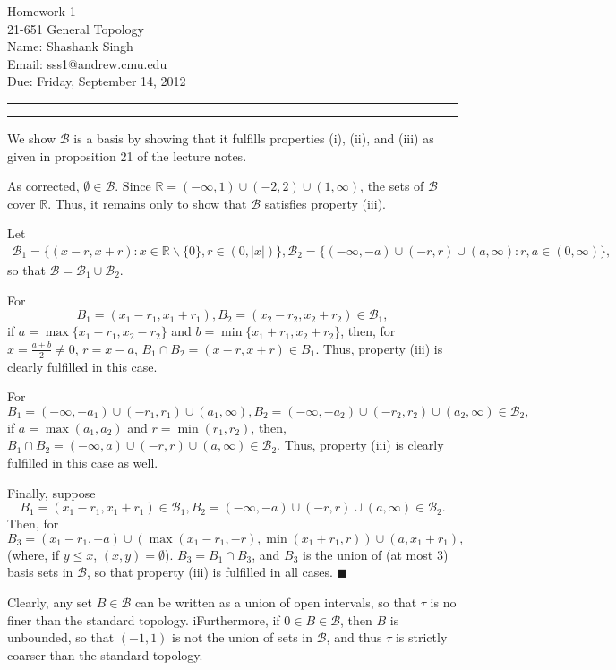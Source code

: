 \documentclass[11pt]{article}
\makeatletter
\newcounter{questionCounter}
\newcounter{partCounter}[questionCounter]
\newenvironment{question}[2][\arabic{questionCounter}]{%
    \setcounter{partCounter}{0}%
    \vspace{.25in} \hrule \vspace{0.5em}%
        \noindent{\bf #2}%
    \vspace{0.8em} \hrule \vspace{.10in}%
    \addtocounter{questionCounter}{1}%
}{}
\newcommand{\myname}{Shashank Singh}
\newcommand{\myandrew}{sss1@andrew.cmu.edu}
\newcommand{\myclass}{21-651 General Topology}
\newcommand{\myhwnum}{1}
\newcommand{\duedate}{Friday, September 14, 2012}
\renewcommand{\qed}{\quad $\blacksquare$}
\newcommand{\sminus}{\backslash}
\makeatother
\begin{document}
\thispagestyle{plain}

{\Large Homework \myhwnum} \\
\myclass \\
Name: \myname \\
Email: \myandrew \\
Due: \duedate \\
\begin{question}{Problem 1}
We show $\mathcal{B}$ is a basis by showing that it fulfills properties (i),
(ii), and (iii) as given in proposition 21 of the lecture notes.

As corrected, $\emptyset \in \mathcal{B}$.
Since $\mathbb{R} = (-\infty,1) \cup (-2,2) \cup (1,\infty)$, the sets of
$\mathcal{B}$ cover $\mathbb{R}$. Thus, it remains only to show that
$\mathcal{B}$ satisfies property (iii).

Let
\begin{align*}
\mathcal{B}_1 = \{(x - r,x + r) : x \in \mathbb{R}\sminus\{0\},
                                                              r \in (0,|x|)\},
\mathcal{B}_2 = \{(-\infty,-a) \cup (-r,r) \cup (a,\infty) :
                                                         r,a \in (0,\infty)\},
\end{align*}
so that $\mathcal{B} = \mathcal{B_1} \cup \mathcal{B_2}$.

For
\[B_1 = (x_1 - r_1,x_1 + r_1),B_2 = (x_2 - r_2,x_2 + r_2) \in \mathcal{B}_1,\]
if
$a = \max\{x_1 - r_1,x_2 - r_2\}$ and $b = \min\{x_1 + r_1,x_2 + r_2\}$,
then, for $x = \frac{a + b}{2} \neq 0$, $r = x - a$,
$B_1 \cap B_2 = (x - r,x + r) \in B_1$. Thus, property (iii) is clearly
fulfilled in this case.

For 
\[B_1 = (-\infty,-a_1) \cup (-r_1,r_1) \cup (a_1,\infty),
  B_2 = (-\infty,-a_2) \cup (-r_2,r_2) \cup (a_2,\infty) \in \mathcal{B}_2,\]
if $a = \max(a_1,a_2)$ and $r = \min(r_1,r_2)$, then,
$B_1 \cap B_2 = (-\infty,a) \cup (-r,r) \cup (a,\infty) \in \mathcal{B}_2$.
Thus, property (iii) is clearly fulfilled in this case as well.

Finally, suppose
\[B_1 = (x_1 - r_1,x_1 + r_1) \in \mathcal{B}_1,
  B_2 = (-\infty,-a) \cup (-r,r) \cup (a,\infty) \in \mathcal{B}_2.\]
Then, for
\[B_3 = (x_1 - r_1,-a) \cup (\max(x_1 - r_1,-r),\min(x_1 + r_1,r)) \cup (a,x_1 + r_1),\]
(where, if $y \leq x$, $(x,y) = \emptyset$).
$B_3 = B_1 \cap B_3$, and  $B_3$ is the union of (at most $3$) basis sets in
$\mathcal{B}$, so that property (iii) is fulfilled in all cases. \qed

Clearly, any set $B \in \mathcal{B}$ can be written as a union of open
intervals, so that $\tau$ is no finer than the standard topology.
iFurthermore, if $0 \in B \in \mathcal{B}$, then $B$ is unbounded, so that
$(-1,1)$ is not the union of sets in $\mathcal{B}$, and thus $\tau$ is
strictly coarser than the standard topology.
\end{question}
\end{document}
